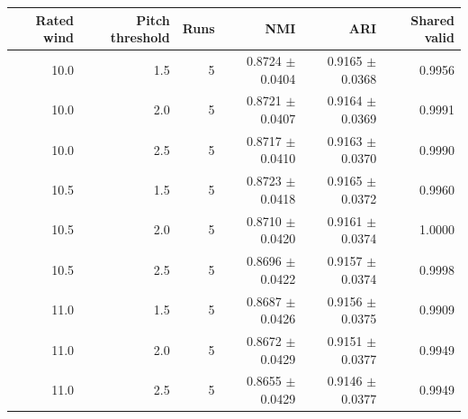 \begin{tabular}{rrrrrr}
\toprule
Rated wind & Pitch threshold & Runs & NMI & ARI & Shared valid \\
\midrule
10.0 & 1.5 & 5 & 0.8724 $\pm$ 0.0404 & 0.9165 $\pm$ 0.0368 & 0.9956 \\
10.0 & 2.0 & 5 & 0.8721 $\pm$ 0.0407 & 0.9164 $\pm$ 0.0369 & 0.9991 \\
10.0 & 2.5 & 5 & 0.8717 $\pm$ 0.0410 & 0.9163 $\pm$ 0.0370 & 0.9990 \\
10.5 & 1.5 & 5 & 0.8723 $\pm$ 0.0418 & 0.9165 $\pm$ 0.0372 & 0.9960 \\
10.5 & 2.0 & 5 & 0.8710 $\pm$ 0.0420 & 0.9161 $\pm$ 0.0374 & 1.0000 \\
10.5 & 2.5 & 5 & 0.8696 $\pm$ 0.0422 & 0.9157 $\pm$ 0.0374 & 0.9998 \\
11.0 & 1.5 & 5 & 0.8687 $\pm$ 0.0426 & 0.9156 $\pm$ 0.0375 & 0.9909 \\
11.0 & 2.0 & 5 & 0.8672 $\pm$ 0.0429 & 0.9151 $\pm$ 0.0377 & 0.9949 \\
11.0 & 2.5 & 5 & 0.8655 $\pm$ 0.0429 & 0.9146 $\pm$ 0.0377 & 0.9949 \\
\bottomrule
\end{tabular}
